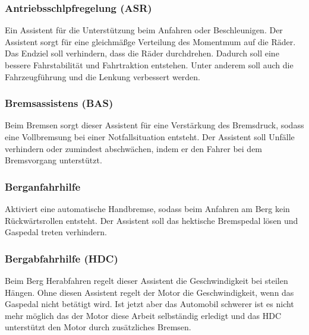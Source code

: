         \subsubsection{Antriebsschlpfregelung (ASR)}
        Ein Assistent für die Unterstützung beim Anfahren oder Beschleunigen. Der
        Assistent sorgt für eine gleichmäßge Verteilung des Momentmum auf die Räder.
        Das Endziel soll verhindern, dass die Räder durchdrehen. Dadurch soll eine 
        bessere Fahrstabilität und Fahrtraktion entstehen. Unter anderem soll auch 
        die Fahrzeugführung und die Lenkung verbessert werden.
        ~\cite{assistenzsysteme.PB2} ~\cite{ASR.PB1} ~\cite{ASR.PB2} 

        \subsubsection{Bremsassistens (BAS)}
        Beim Bremsen sorgt dieser Assistent für eine Verstärkung des Bremsdruck, sodass
        eine Vollbremsung bei einer Notfallsituation entsteht. Der Assistent soll Unfälle 
        verhindern oder zumindest abschwächen, indem er den Fahrer bei dem Bremsvorgang 
        unterstützt.
        ~\cite{assistenzsysteme.PB2} ~\cite{bremsassi.PB1} ~\cite{bremsassi.PB2}

        \subsubsection{Berganfahrhilfe}
        Aktiviert eine automatische Handbremse, sodass beim Anfahren am Berg kein Rückwärtsrollen
        entsteht. Der Assistent soll das hektische Bremspedal lösen und Gaspedal treten 
        verhindern.
        ~\cite{berganfahr.PB1} ~\cite{berganfahr.PB2}  ~\cite{assistenzsysteme.PB2}
        
        \subsubsection{Bergabfahrhilfe (HDC)}
        Beim Berg Herabfahren regelt dieser Assistent die Geschwindigkeit bei steilen Hängen. 
        Ohne diesen Assistent regelt der Motor die Geschwindigkeit, wenn das Gaspedal nicht 
        betätigt wird. Ist jetzt aber das Automobil schwerer ist es nicht mehr möglich das 
        der Motor diese Arbeit selbständig erledigt und das HDC unterstützt den Motor durch 
        zusätzliches Bremsen.
        ~\cite{assistenzsysteme.PB2} ~\cite{bergabfahr.PB1} 

